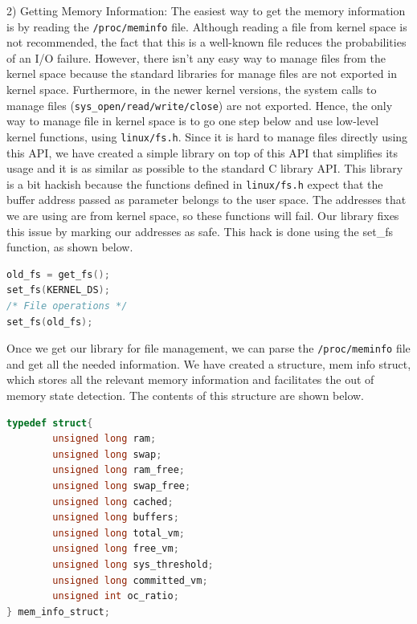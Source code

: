 2) Getting Memory Information: The easiest way to get the memory information is by
reading the \texttt{/proc/meminfo} file. Although reading a file from kernel space
is not recommended, the fact that this is a well-known file reduces the probabilities
of an I/O failure. However, there isn’t any easy way to manage files from the kernel
space because the standard libraries for manage files are not exported in kernel
space. Furthermore, in the newer kernel versions, the system calls to manage files
(\texttt{sys\_{open/read/write/close}}) are not exported. Hence, the only way to
manage file in kernel space is to go one step below and use low-level kernel functions,
using \texttt{linux/fs.h}. Since it is hard to manage files directly using this API,
we have created a simple library on top of this API that simplifies its usage and
it is as similar as possible to the standard C library API. This library is a bit
hackish because the functions defined in \texttt{linux/fs.h} expect that the buffer
address passed as parameter belongs to the user space. The addresses that we are
using are from kernel space, so these functions will fail. Our library fixes this
issue by marking our addresses as safe. This hack is done using the set\_fs function,
as shown below.

\begin{lstlisting}[language=C]
old_fs = get_fs();
set_fs(KERNEL_DS);
/* File operations */
set_fs(old_fs);
\end{lstlisting}

Once \hspace{0.01cm} we \hspace{0.01cm} get \hspace{0.01cm} our \hspace{0.01cm} library
for \hspace{0.01cm} file \hspace{0.01cm} management,\hspace{0.01cm} we can \hspace{0.01cm} parse the \texttt{/proc/meminfo}
file and get all the needed information. We have created a structure, mem info
struct, which stores all the relevant memory information and facilitates the out
of memory state detection. The contents of this structure are shown below.

\begin{lstlisting}[language=C]
typedef struct{
        unsigned long ram;
        unsigned long swap;
        unsigned long ram_free;
        unsigned long swap_free;
        unsigned long cached;
        unsigned long buffers;
        unsigned long total_vm;
        unsigned long free_vm;
        unsigned long sys_threshold;
        unsigned long committed_vm;
        unsigned int oc_ratio;
} mem_info_struct;
\end{lstlisting}

